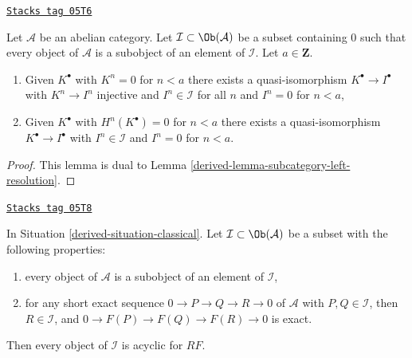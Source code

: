 \begin{lemma}
\label{derived-lemma-subcategory-right-resolution}
\href{https://stacks.math.columbia.edu/tag/05T6}{\texttt{Stacks tag 05T6}}

Let $\mathcal{A}$ be an abelian category. Let
$\mathcal{I} \subset \Ob(\mathcal{A})$ be a subset containing $0$
such that every object of $\mathcal{A}$ is a subobject of an element of
$\mathcal{I}$. Let $a \in \mathbf{Z}$.
\begin{enumerate}
\item Given $K^\bullet$ with $K^n = 0$ for $n < a$
there exists a quasi-isomorphism $K^\bullet \to I^\bullet$
with $K^n \to I^n$ injective and $I^n \in \mathcal{I}$ for all $n$
and $I^n = 0$ for $n < a$,
\item Given $K^\bullet$ with $H^n(K^\bullet) = 0$
for $n < a$ there exists a quasi-isomorphism $K^\bullet \to I^\bullet$
with $I^n \in \mathcal{I}$ and $I^n = 0$ for $n < a$.
\end{enumerate}
\end{lemma}

\begin{proof}

This lemma is dual to Lemma \ref{derived-lemma-subcategory-left-resolution}.
\end{proof}

\begin{lemma}
\label{derived-lemma-subcategory-right-acyclics}
\href{https://stacks.math.columbia.edu/tag/05T8}{\texttt{Stacks tag 05T8}}

In
Situation \ref{derived-situation-classical}.
Let $\mathcal{I} \subset \Ob(\mathcal{A})$ be a subset with the
following properties:
\begin{enumerate}
\item every object of $\mathcal{A}$ is a subobject of an element of
$\mathcal{I}$,
\item for any short exact sequence $0 \to P \to Q \to R \to 0$ of
$\mathcal{A}$ with $P, Q \in \mathcal{I}$, then $R \in \mathcal{I}$,
and $0 \to F(P) \to F(Q) \to F(R) \to 0$ is exact.
\end{enumerate}
Then every object of $\mathcal{I}$ is acyclic for $RF$.
\end{lemma}

